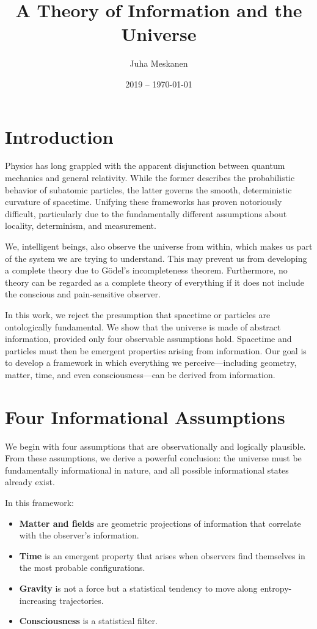 \documentclass[11pt]{article}
\title{\LARGE A Theory of Information and the Universe}
\author{Juha Meskanen}
\date{2019 -- \today}
\begin{document}
\maketitle

\section{Introduction}

Physics has long grappled with the apparent disjunction between quantum mechanics and general relativity. While the former describes the probabilistic behavior of subatomic particles, the latter governs the smooth, deterministic curvature of spacetime. Unifying these frameworks has proven notoriously difficult, particularly due to the fundamentally different assumptions about locality, determinism, and measurement.

We, intelligent beings, also observe the universe from within, which makes us part of the system we are trying to understand. This may prevent us from developing a complete theory due to Gödel's incompleteness theorem. Furthermore, no theory can be regarded as a complete theory of everything if it does not include the conscious and pain-sensitive observer.

In this work, we reject the presumption that spacetime or particles are ontologically fundamental. We show that the universe is made of abstract information, provided only four observable assumptions hold. Spacetime and particles must then be emergent properties arising from information. Our goal is to develop a framework in which everything we perceive—including geometry, matter, time, and even consciousness—can be derived from information.

\section{Four Informational Assumptions}

We begin with four assumptions that are observationally and logically plausible. From these assumptions, we derive a powerful conclusion: the universe must be fundamentally informational in nature, and all possible informational states already exist.

In this framework:

\begin{itemize}
      \item \textbf{Matter and fields} are geometric projections of information that correlate with the observer's information.
      \item \textbf{Time} is an emergent property that arises when observers find themselves in the most probable configurations.
      \item \textbf{Gravity} is not a force but a statistical tendency to move along entropy-increasing trajectories.
      \item \textbf{Consciousness} is a statistical filter.
\end{itemize}
\end{document}
